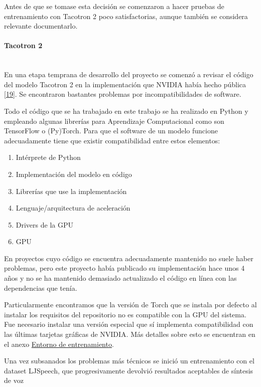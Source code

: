 Antes de que se tomase esta decisión se comenzaron a hacer pruebas de entrenamiento con Tacotron 2 poco satisfactorias, aunque también se considera relevante documentarlo.

\paragraph{Tacotron 2} ~\\

En una etapa temprana de desarrollo del proyecto se comenzó a revisar el código del modelo Tacotron 2 en la implementación que NVIDIA había hecho pública \hyperref[RES_5]{[19]}. Se encontraron bastantes problemas por incompatibilidades de software.

Todo el código que se ha trabajado en este trabajo se ha realizado en Python y empleando algunas librerías para Aprendizaje Computacional como son TensorFlow o (Py)Torch. Para que el software de un modelo funcione adecuadamente tiene que existir compatibilidad entre estos elementos:

\begin{enumerate}
    \item Intérprete de Python
    \item Implementación del modelo en código
    \item Librerías que use la implementación
    \item Lenguaje/arquitectura de aceleración
    \item Drivers de la GPU
    \item GPU
\end{enumerate}

En proyectos cuyo código se encuentra adecuadamente mantenido no suele haber problemas, pero este proyecto había publicado su implementación hace unos 4 años y no se ha mantenido demasiado actualizado el código en línea con las dependencias que tenía.

Particularmente encontramos que la versión de Torch que se instala por defecto al instalar los requisitos del repositorio no es compatible con la GPU del sistema. Fue necesario instalar una versión especial que sí implementa compatibilidad con las últimas tarjetas gráficas de NVIDIA. Más detalles sobre esto se encuentran en el anexo \hyperref[Entorno de entrenamiento]{Entorno de entrenamiento}.

Una vez subsanados los problemas más técnicos se inició un entrenamiento con el dataset LJSpeech, que progresivamente devolvió resultados aceptables de síntesis de voz


